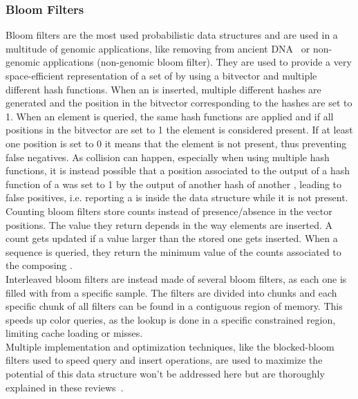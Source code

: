 \subsubsection{Bloom Filters}
\label{sec:bloom_filters}
Bloom filters are the most used probabilistic data structures and are used in a multitude of genomic applications, like removing from ancient DNA~\cite{akmerbroom} or non-genomic applications (non-genomic bloom filter). They are used to provide a very space-efficient representation of a set of \kmers by using a bitvector and multiple different hash functions. When an \kmer is inserted, multiple different hashes are generated and the position in the bitvector corresponding to the hashes are set to 1. When an element is queried, the same hash functions are applied and if all positions in the bitvector are set to 1 the element is considered present. If at least one position is set to 0 it means that the element is not present, thus preventing false negatives. As collision can happen, especially when using multiple hash functions, it is instead possible that a position associated to the output of a hash function of a \kmer was set to 1 by the output of another hash of another \kmer, leading to false positives, i.e. reporting a \kmer is inside the data structure while it is not present.\\
Counting bloom filters store counts instead of presence/absence in the vector positions. The value they return depends in the way elements are inserted. A \kmer count gets updated if a value larger than the stored one gets inserted. When a sequence is queried, they return the minimum value of the counts associated to the composing \kmers.\\
Interleaved bloom filters are instead made of several bloom filters, as each one is filled with \kmers from a specific sample. The filters are divided into chunks and each specific chunk of all filters can be found in a contiguous region of memory. This speeds up color queries, as the lookup is done in a specific constrained region, limiting cache loading or misses.\\
Multiple implementation and optimization techniques, like the blocked-bloom filters used to speed query and insert operations, are used to maximize the potential of this data structure won't be addressed here but are thoroughly explained in these reviews~\cite{marchet2024kmersets,marchet2021kmer,marchet2024coloredkmersets}. 

